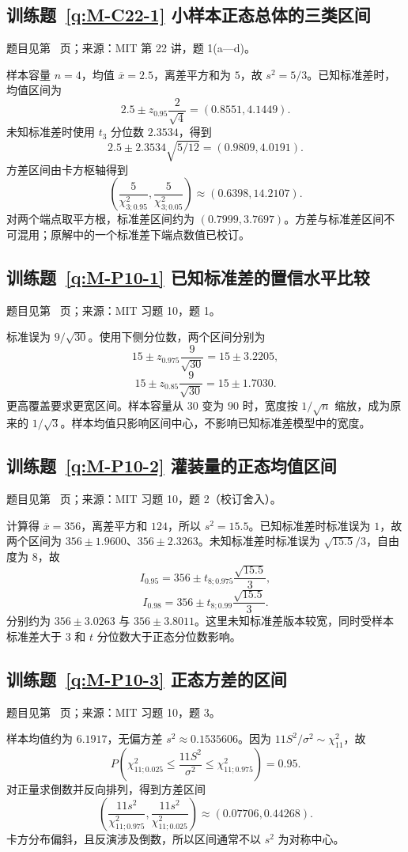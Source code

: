 \documentclass[UTF8,12pt,a4paper,fontset=fandol]{ctexbook}
\begin{document}
\subsection*{训练题~\ref{q:M-C22-1} 小样本正态总体的三类区间}\label{a:M-C22-1}{\small 题目见第~\pageref{q:M-C22-1} 页；来源：MIT 第 22 讲，题 1(a—d)。}
\begin{solve}样本容量 $n=4$，均值 $\overline x=2.5$，离差平方和为 $5$，故 $s^2=5/3$。已知标准差时，均值区间为\[2.5\pm z_{0.95}\frac2{\sqrt4}=(0.8551,4.1449).\]未知标准差时使用 $t_3$ 分位数 $2.3534$，得到\[2.5\pm2.3534\sqrt{5/12}=(0.9809,4.0191).\]方差区间由卡方枢轴得到\[\left(\frac5{\chi^2_{3;0.95}},\frac5{\chi^2_{3;0.05}}\right)\approx(0.6398,14.2107).\]对两个端点取平方根，标准差区间约为 $(0.7999,3.7697)$。方差与标准差区间不可混用；原解中的一个标准差下端点数值已校订。\end{solve}

\subsection*{训练题~\ref{q:M-P10-1} 已知标准差的置信水平比较}\label{a:M-P10-1}{\small 题目见第~\pageref{q:M-P10-1} 页；来源：MIT 习题 10，题 1。}
\begin{solve}标准误为 $9/\sqrt{30}$。使用下侧分位数，两个区间分别为\[15\pm z_{0.975}\frac9{\sqrt{30}}=15\pm3.2205,\]\[15\pm z_{0.85}\frac9{\sqrt{30}}=15\pm1.7030.\]更高覆盖要求更宽区间。样本容量从 $30$ 变为 $90$ 时，宽度按 $1/\sqrt n$ 缩放，成为原来的 $1/\sqrt3$。样本均值只影响区间中心，不影响已知标准差模型中的宽度。\end{solve}

\subsection*{训练题~\ref{q:M-P10-2} 灌装量的正态均值区间}\label{a:M-P10-2}{\small 题目见第~\pageref{q:M-P10-2} 页；来源：MIT 习题 10，题 2（校订舍入）。}
\begin{solve}计算得 $\overline x=356$，离差平方和 $124$，所以 $s^2=15.5$。已知标准差时标准误为 $1$，故两个区间为 $356\pm1.9600$、$356\pm2.3263$。未知标准差时标准误为 $\sqrt{15.5}/3$，自由度为 $8$，故\[I_{0.95}=356\pm t_{8;0.975}\frac{\sqrt{15.5}}3,\]\[I_{0.98}=356\pm t_{8;0.99}\frac{\sqrt{15.5}}3.\]分别约为 $356\pm3.0263$ 与 $356\pm3.8011$。这里未知标准差版本较宽，同时受样本标准差大于 $3$ 和 $t$ 分位数大于正态分位数影响。\end{solve}

\subsection*{训练题~\ref{q:M-P10-3} 正态方差的区间}\label{a:M-P10-3}{\small 题目见第~\pageref{q:M-P10-3} 页；来源：MIT 习题 10，题 3。}
\begin{solve}样本均值约为 $6.1917$，无偏方差 $s^2\approx0.1535606$。因为 $11S^2/\sigma^2\sim\chi^2_{11}$，故\[P\left(\chi^2_{11;0.025}\le\frac{11S^2}{\sigma^2}\le\chi^2_{11;0.975}\right)=0.95.\]对正量求倒数并反向排列，得到方差区间\[\left(\frac{11s^2}{\chi^2_{11;0.975}},\frac{11s^2}{\chi^2_{11;0.025}}\right)\approx(0.07706,0.44268).\]卡方分布偏斜，且反演涉及倒数，所以区间通常不以 $s^2$ 为对称中心。\end{solve}
\end{document}
